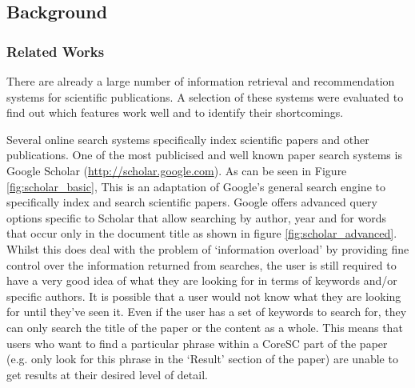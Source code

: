 \subsection{Background}

\subsubsection{ Related Works }

There are already a large number of information retrieval and recommendation
systems for scientific publications. A selection of these systems were
evaluated to find out which features work well and to identify their
shortcomings.

Several online search systems specifically index scientific papers and other
publications. One of the most publicised and well known paper search systems is
Google Scholar (\url{http://scholar.google.com}).  As can be seen in Figure
\ref{fig:scholar_basic}, This is an adaptation of Google's general search
engine to specifically index and search scientific papers.  Google offers
advanced query options specific to Scholar that allow searching by author, year
and for words that occur only in the document title as shown in figure
\ref{fig:scholar_advanced}. Whilst this does deal with the problem of
`information overload' by providing fine control over the information returned
from searches,  the user is still required to have a very good idea of what
they are looking for in terms of keywords and/or specific authors. It is
possible that a user would not know what they are looking for until they've
seen it. Even if the user has a set of keywords to search for, they can only
search the title of the paper or the content as a whole. This means that users
who want to find a particular phrase within a CoreSC part of the paper (e.g.
only look for this phrase in the `Result' section of the paper) are unable to
get results at their desired level of detail.

